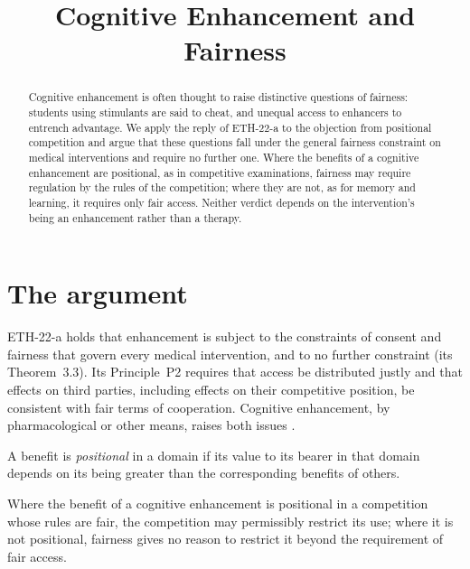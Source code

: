 \documentclass{situationist-preprint}
\title{Cognitive Enhancement and Fairness}
\begin{document}
\maketitle

\begin{abstract}
Cognitive enhancement is often thought to raise distinctive questions of fairness: students using stimulants are said to cheat, and unequal access to enhancers to entrench advantage. We apply the reply of ETH-22-a to the objection from positional competition and argue that these questions fall under the general fairness constraint on medical interventions and require no further one. Where the benefits of a cognitive enhancement are positional, as in competitive examinations, fairness may require regulation by the rules of the competition; where they are not, as for memory and learning, it requires only fair access. Neither verdict depends on the intervention's being an enhancement rather than a therapy.
\end{abstract}

\section{The argument}

ETH-22-a holds that enhancement is subject to the constraints of consent and fairness that govern every medical intervention, and to no further constraint (its Theorem~3.3). Its Principle~P2 requires that access be distributed justly and that effects on third parties, including effects on their competitive position, be consistent with fair terms of cooperation. Cognitive enhancement, by pharmacological or other means, raises both issues \citep{Greely2008,BostromSandberg2009}.

\begin{definition}\label{d:positional}
A benefit is \emph{positional} in a domain if its value to its bearer in that domain depends on its being greater than the corresponding benefits of others.
\end{definition}

\begin{proposition}\label{p:competition}
Where the benefit of a cognitive enhancement is positional in a competition whose rules are fair, the competition may permissibly restrict its use; where it is not positional, fairness gives no reason to restrict it beyond the requirement of fair access.
\end{proposition}
\end{document}
